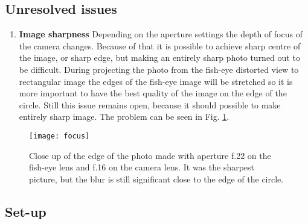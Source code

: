 \documentclass[]{book}
\begin{document}
	\subsection{Unresolved issues}
	\begin{enumerate}
		\item \textbf{Image sharpness} Depending on the aperture settings the depth of focus of the camera changes. Because of that it is possible to achieve sharp centre of the image, or sharp edge, but making an entirely sharp photo turned out to be difficult. During projecting the photo from the fish-eye distorted view to rectangular image the edges of the fish-eye image will be stretched so it is more important to have the best quality of the image on the edge of the circle. Still this issue remains open, because it should possible to make entirely sharp image. The problem can be seen in Fig. \ref{fig: focus}.
	\end{enumerate}

	\begin{figure}
		\texttt{[image: focus]}
		\caption{Close up of the edge of the photo made with aperture f.22 on the fish-eye lens and f.16 on the camera lens. It was the sharpest picture, but the blur is still significant close to the edge of the circle.}
		\label{fig: focus}
	\end{figure}

	\subsection{Set-up}
	
\end{document}
